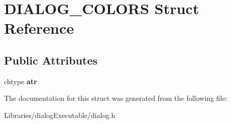 \hypertarget{struct_d_i_a_l_o_g___c_o_l_o_r_s}{}\section{D\+I\+A\+L\+O\+G\+\_\+\+C\+O\+L\+O\+RS Struct Reference}
\label{struct_d_i_a_l_o_g___c_o_l_o_r_s}
\subsection*{Public Attributes}
\begin{DoxyCompactItemize}
\item 
chtype {\bfseries atr}\hypertarget{struct_d_i_a_l_o_g___c_o_l_o_r_s_a419b8c4e59a0ee12bae97c61546a0939}{}\label{struct_d_i_a_l_o_g___c_o_l_o_r_s_a419b8c4e59a0ee12bae97c61546a0939}

\end{DoxyCompactItemize}


The documentation for this struct was generated from the following file\+:\begin{DoxyCompactItemize}
\item 
Libraries/dialog\+Executable/dialog.\+h\end{DoxyCompactItemize}
